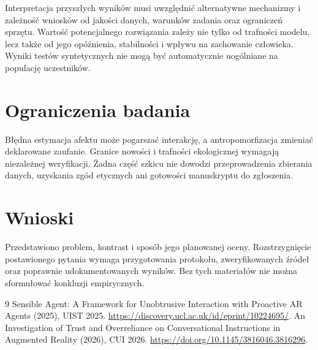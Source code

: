 \documentclass[11pt,a4paper]{article}
\begin{document}
Interpretacja przyszłych wyników musi uwzględnić alternatywne mechanizmy i zależność wniosków od jakości danych, warunków zadania oraz ograniczeń sprzętu. Wartość potencjalnego rozwiązania zależy nie tylko od trafności modelu, lecz także od jego opóźnienia, stabilności i wpływu na zachowanie człowieka. Wyniki testów syntetycznych nie mogą być automatycznie uogólniane na populację uczestników.

\section{Ograniczenia badania}

Błędna estymacja afektu może pogarszać interakcję, a antropomorfizacja zmieniać deklarowane zaufanie. Granice nowości i trafności ekologicznej wymagają niezależnej weryfikacji. Żadna część szkicu nie dowodzi przeprowadzenia zbierania danych, uzyskania zgód etycznych ani gotowości manuskryptu do zgłoszenia.

\section{Wnioski}

Przedstawiono problem, kontrast i sposób jego planowanej oceny. Rozstrzygnięcie postawionego pytania wymaga przygotowania protokołu, zweryfikowanych źródeł oraz poprawnie udokumentowanych wyników. Bez tych materiałów nie można sformułować konkluzji empirycznych.

\begin{thebibliography}{9}
 Sensible Agent: A Framework for Unobtrusive Interaction with Proactive AR Agents (2025), UIST 2025. \url{https://discovery.ucl.ac.uk/id/eprint/10224695/}.
 An Investigation of Trust and Overreliance on Conversational Instructions in Augmented Reality (2026), CUI 2026. \url{https://doi.org/10.1145/3816046.3816296}.
\end{thebibliography}
\end{document}
